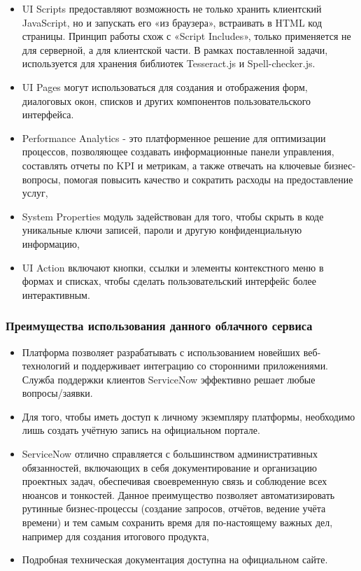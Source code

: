 \documentclass[14pt]{mmcs_article}
\begin{document}
\begin{itemize}
\item UI Scripts \cite{stud:b6} предоставляют возможность не только хранить клиентский JavaScript, но и запускать его «из браузера», встраивать в HTML код страницы. Принцип работы схож с «Script Includes», только применяется не для серверной, а для клиентской части. В рамках поставленной задачи, используется для хранения библиотек Tesseract.js и Spell-checker.js.
\item UI Pages \cite{stud:b7} могут использоваться для создания и отображения форм, диалоговых окон, списков и других компонентов пользовательского интерфейса.
\item Performance Analytics \cite{stud:b8} - это платформенное решение для оптимизации процессов, позволяющее создавать информационные панели управления, составлять отчеты по KPI и метрикам, а также отвечать на ключевые бизнес-вопросы, помогая повысить качество и сократить расходы на предоставление услуг,
\item System Properties \cite{stud:b9} модуль задействован для того, чтобы скрыть в коде уникальные ключи записей, пароли и другую конфиденциальную информацию, 
\item UI Action \cite{stud:b10} включают кнопки, ссылки и элементы контекстного меню в формах и списках, чтобы сделать пользовательский интерфейс более интерактивным.
\end{itemize}
\subsubsection{Преимущества использования данного облачного сервиса}
\begin{itemize}
\item Платформа позволяет разрабатывать с использованием новейших веб-технологий и поддерживает интеграцию со сторонними приложениями. Служба поддержки клиентов ServiceNow эффективно решает любые вопросы/заявки.
\item Для того, чтобы иметь доступ к личному экземпляру платформы, необходимо лишь создать учётную запись на официальном портале.
\item ServiceNow отлично справляется с большинством административных обязанностей, включающих в себя документирование и организацию проектных задач, обеспечивая своевременную связь и соблюдение всех нюансов и тонкостей. Данное преимущество позволяет автоматизировать рутинные бизнес-процессы (создание запросов, отчётов, ведение учёта времени) и тем самым сохранить время для по-настоящему важных дел, например для создания итогового продукта,
\item Подробная техническая документация доступна на официальном сайте.
\end{itemize}
\end{document}
